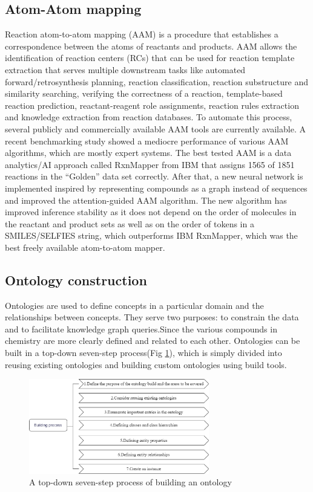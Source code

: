 \documentclass[%
 aip,
 jmp,%
 amsmath,amssymb,
 reprint,%
]{revtex4-2}
\begin{document}
\subsection{Atom-Atom mapping}
Reaction atom-to-atom mapping (AAM) is a procedure that establishes a correspondence between the atoms of 
reactants and products. AAM allows the identification of reaction centers (RCs) that can be used for reaction template 
extraction that serves multiple downstream tasks like automated forward/retrosynthesis planning, 
reaction classification, reaction substructure and similarity searching, verifying the correctness of a reaction, template-based reaction prediction, 
reactant-reagent role assignments, reaction rules extraction and knowledge extraction from reaction databases. 
To automate this process, several publicly and commercially available AAM tools are currently available. 
A recent benchmarking study showed a mediocre performance of 
various AAM algorithms, which are mostly expert systems. The best tested AAM is a data analytics/AI 
approach called RxnMapper from IBM that assigns 1565 of 1851 reactions in the “Golden” data set correctly.
After that, a new neural network is implemented inspired by representing compounds as a graph 
instead of sequences and improved the attention-guided AAM algorithm. The new algorithm has improved 
inference stability as it does not depend on the order of molecules in the reactant and product 
sets as well as on the order of tokens in a SMILES/SELFIES string, which outperforms IBM RxnMapper, 
which was the best freely available atom-to-atom mapper.

\subsection{Ontology construction}
Ontologies are used to define concepts in a particular domain and the relationships between concepts. They serve two purposes: to constrain 
the data and to facilitate knowledge graph queries.Since the various compounds in chemistry are more clearly defined and related to each other.
Ontologies can be built in a top-down seven-step process(Fig \ref{ Fig.4 }), which is simply divided 
into reusing existing ontologies and building custom ontologies using build tools.
\begin{figure}[htbp]
 \centering
 \includegraphics[width=0.7\textwidth]{figure/4.png}
 \caption{ A top-down seven-step process of building an ontology }
 \label{ Fig.4 }
\end{figure}
\end{document}
